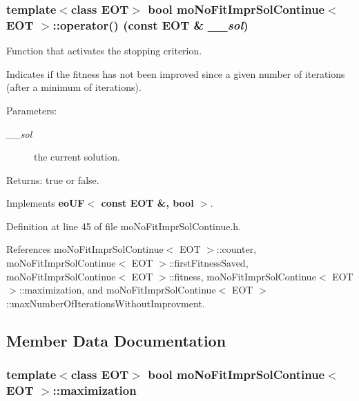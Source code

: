 \subsubsection{\setlength{\rightskip}{0pt plus 5cm}template$<$class EOT$>$ bool {\bf moNoFitImprSolContinue}$<$ EOT $>$::operator() (const EOT \& {\em \_\-\_\-sol})\hspace{0.3cm}{\tt  [inline, virtual]}}\label{classmo_no_fit_impr_sol_continue_dbd663623cae56ec76ee504ecb226fed}


Function that activates the stopping criterion. 

Indicates if the fitness has not been improved since a given number of iterations (after a minimum of iterations). \begin{Desc}
\item[Parameters:]
\begin{description}
\item[{\em \_\-\_\-sol}]the current solution. \end{description}
\end{Desc}
\begin{Desc}
\item[Returns:]true or false. \end{Desc}


Implements {\bf eoUF$<$ const EOT \&, bool $>$}.

Definition at line 45 of file moNoFitImprSolContinue.h.

References moNoFitImprSolContinue$<$ EOT $>$::counter, moNoFitImprSolContinue$<$ EOT $>$::firstFitnessSaved, moNoFitImprSolContinue$<$ EOT $>$::fitness, moNoFitImprSolContinue$<$ EOT $>$::maximization, and moNoFitImprSolContinue$<$ EOT $>$::maxNumberOfIterationsWithoutImprovment.

\subsection{Member Data Documentation}
\subsubsection{\setlength{\rightskip}{0pt plus 5cm}template$<$class EOT$>$ bool {\bf moNoFitImprSolContinue}$<$ EOT $>$::{\bf maximization}\hspace{0.3cm}{\tt  [private]}}\label{classmo_no_fit_impr_sol_continue_73295d6a4ad437b0ab06848ac24698c4}


